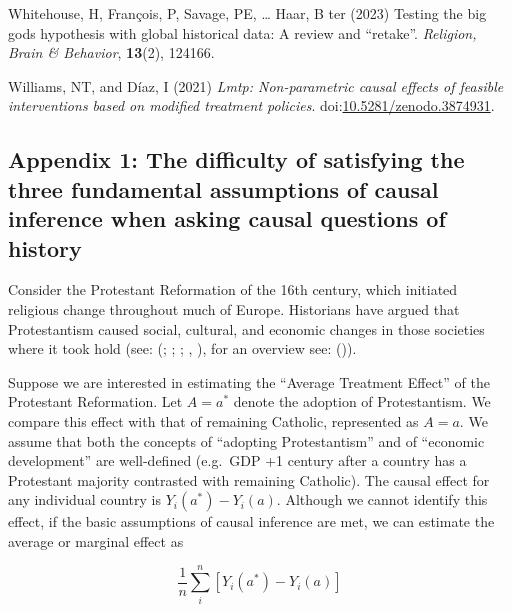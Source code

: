\documentclass[
  singlecolumn,
  9pt]{article}
\begin{document}
\begin{CSLReferences}
Whitehouse, H, François, P, Savage, PE, \ldots{} Haar, B ter (2023)
Testing the big gods hypothesis with global historical data: A review
and {``}retake{''}. \emph{Religion, Brain \& Behavior}, \textbf{13}(2),
124166.

Williams, NT, and Díaz, I (2021) \emph{Lmtp: Non-parametric causal
effects of feasible interventions based on modified treatment policies}.
doi:\href{https://doi.org/10.5281/zenodo.3874931}{10.5281/zenodo.3874931}.

\end{CSLReferences}

\newpage{}

\subsection{Appendix 1: The difficulty of satisfying the three
fundamental assumptions of causal inference when asking causal questions
of
history}\label{appendix-1-the-difficulty-of-satisfying-the-three-fundamental-assumptions-of-causal-inference-when-asking-causal-questions-of-history}

Consider the Protestant Reformation of the 16th century, which initiated
religious change throughout much of Europe. Historians have argued that
Protestantism caused social, cultural, and economic changes in those
societies where it took hold (see: (; ;
; , ), for an overview see:
()).

Suppose we are interested in estimating the ``Average Treatment Effect''
of the Protestant Reformation. Let \(A = a^*\) denote the adoption of
Protestantism. We compare this effect with that of remaining Catholic,
represented as \(A = a\). We assume that both the concepts of ``adopting
Protestantism'' and of ``economic development'' are well-defined
(e.g.~GDP +1 century after a country has a Protestant majority
contrasted with remaining Catholic). The causal effect for any
individual country is \(Y_i(a^*) - Y_i(a)\). Although we cannot identify
this effect, if the basic assumptions of causal inference are met, we
can estimate the average or marginal effect as

\[
\frac{1}{n} \sum_i^{n} \left[ Y_i(a^*) - Y_i(a) \right]
\]
\end{document}
